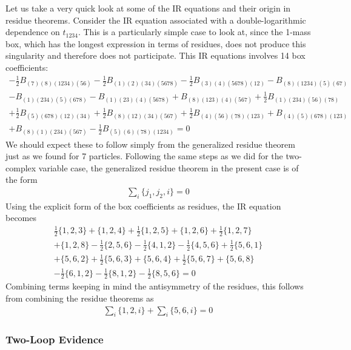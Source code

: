 \documentclass[12pt]{article}
\newcommand{\be}{\begin{eqnarray}}
\newcommand{\ee}{\end{eqnarray}}
\begin{document}
Let us take a very quick look at some of the IR equations and their origin in residue theorems. Consider the IR equation associated with a double-logarithmic dependence on $t_{1234}$. This is a particularly simple case to look at, since the 1-mass box, which has the longest expression in terms of residues, does not produce this singularity and therefore does not participate. This IR equations involves 14 box coefficients:
\begin{eqnarray}
-\frac{1}{2}B_{(7)(8)(1234)(56)} - \frac{1}{2} B_{(1)(2)(34)(5678)} -\frac{1}{2}B_{(3)(4)(5678)(12)}
- B_{(8)(1234)(5)(67)} \nonumber \\ - B_{(1)(234)(5)(678)} - B_{(1)(23)(4)(5678)} +
B_{(8)(123)(4)(567)} + \frac{1}{2} B_{(1)(234)(56)(78)} \nonumber \\ + \frac{1}{2} B_{(5)(678)(12)(34)} + \frac{1}{2}
B_{(8)(12)(34)(567)} + \frac{1}{2} B_{(4)(56)(78)(123)} + B_{(4)(5)(678)(123)} \nonumber \\ + B_{(8)(1)(234)(567)} -\frac{1}{2} B_{(5)(6)(78)(1234)} = 0
\end{eqnarray}
We should expect these to follow simply from the generalized residue theorem just as we found for 7 particles. Following the same steps as we did for the two-complex variable case, the generalized residue theorem in the present case is of the form
\be
\sum_i \{j_1,j_2,i\} = 0
\ee
Using the explicit form of the box coefficients as residues, the IR equation becomes
\begin{eqnarray}
\frac{1}{2} \{1, 2, 3\} + \{1, 2, 4\} + \frac{1}{2} \{1, 2, 5\} + \{1, 2, 6\}+ \frac{1}{2} \{1, 2, 7\} \nonumber \\ + \{1, 2, 8\}
-\frac{1}{2}\{2,
5, 6\} - \frac{1}{2}\{4, 1, 2\} - \frac{1}{2}\{4, 5, 6\} + \frac{1}{2} \{5, 6, 1\} \nonumber \\ + \{5, 6, 2\}+ \frac{1}{2}\{5, 6, 3\}+ \{5,
6, 4\}+ \frac{1}{2}\{5, 6, 7\}  + \{5, 6, 8\} \nonumber \\ - \frac{1}{2}\{6, 1, 2\}-\frac{1}{2}\{8, 1, 2\}- \frac{1}{2}\{8, 5, 6\} = 0
\end{eqnarray}
Combining terms keeping in mind the antisymmetry of the residues, this follows from combining the residue theorems as
\be
\sum_i \{1,2,i\} + \sum_i \{5,6,i\} = 0
\ee

\subsubsection{Two-Loop Evidence}
\end{document}
